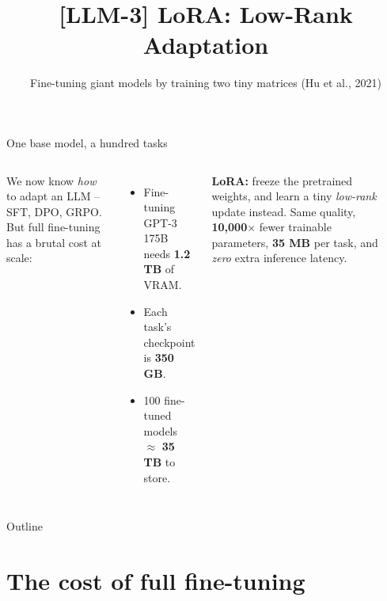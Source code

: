 \documentclass[aspectratio=169]{beamer}
\title{[LLM-3] LoRA: Low-Rank Adaptation}
\subtitle{Fine-tuning giant models by training two tiny matrices (Hu et al., 2021)}
\date{}
\begin{document}
\begin{frame}{One base model, a hundred tasks}
  \begin{columns}[T]
    We now know \emph{how} to adapt an LLM -- SFT, DPO, GRPO. But full fine-tuning has a
    brutal cost at scale:
    \vskip 6pt
    \begin{itemize}\small
      \item Fine-tuning GPT-3 175B needs \textbf{1.2 TB} of VRAM.
      \item Each task's checkpoint is \textbf{350 GB}.
      \item 100 fine-tuned models $\approx$ \textbf{35 TB} to store.
    \end{itemize}
    \vskip 8pt
    \textbf{LoRA:} freeze the pretrained weights, and learn a tiny \emph{low-rank} update
    instead. Same quality, \textbf{10,000$\times$} fewer trainable parameters,
    \textbf{35 MB} per task, and \emph{zero} extra inference latency.
    \begin{center}
    \end{center}
  \end{columns}
\end{frame}

\begin{frame}{Outline}
  \tableofcontents
\end{frame}

\section{The cost of full fine-tuning}
\end{document}
